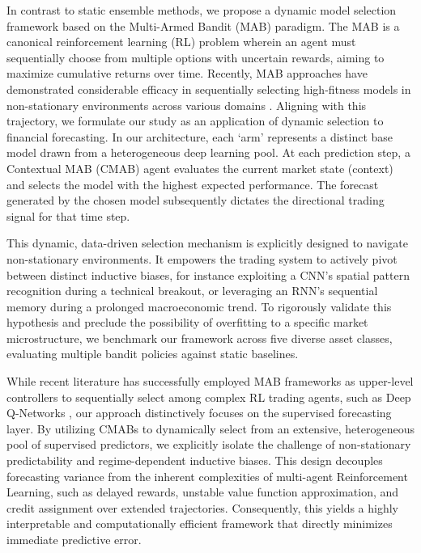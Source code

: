 \documentclass[pdflatex,sn-mathphys-num]{sn-jnl}
\theoremstyle{thmstyleone}%
\theoremstyle{thmstyletwo}%
\theoremstyle{thmstylethree}%
\begin{document}
In contrast to static ensemble methods, we propose a dynamic model selection framework based on the Multi-Armed Bandit (MAB) paradigm. The MAB is a canonical reinforcement learning (RL) problem wherein an agent must sequentially choose from multiple options with uncertain rewards, aiming to maximize cumulative returns over time. Recently, MAB approaches have demonstrated considerable efficacy in sequentially selecting high-fitness models in non-stationary environments across various domains \cite{pandian2025enhancing, wilson2024multi}. Aligning with this trajectory, we formulate our study as an application of dynamic selection to financial forecasting. In our architecture, each `arm' represents a distinct base model drawn from a heterogeneous deep learning pool. At each prediction step, a Contextual MAB (CMAB) agent evaluates the current market state (context) and selects the model with the highest expected performance. The forecast generated by the chosen model subsequently dictates the directional trading signal for that time step.

This dynamic, data-driven selection mechanism is explicitly designed to navigate non-stationary environments. It empowers the trading system to actively pivot between distinct inductive biases, for instance exploiting a CNN's spatial pattern recognition during a technical breakout, or leveraging an RNN's sequential memory during a prolonged macroeconomic trend. To rigorously validate this hypothesis and preclude the possibility of overfitting to a specific market microstructure, we benchmark our framework across five diverse asset classes, evaluating multiple bandit policies against static baselines. 

While recent literature has successfully employed MAB frameworks as upper-level controllers to sequentially select among complex RL trading agents, such as Deep Q-Networks \cite{zhu2019adaptive, zeng2023multi}, our approach distinctively focuses on the supervised forecasting layer. By utilizing CMABs to dynamically select from an extensive, heterogeneous pool of supervised predictors, we explicitly isolate the challenge of non-stationary predictability and regime-dependent inductive biases. This design decouples forecasting variance from the inherent complexities of multi-agent Reinforcement Learning, such as delayed rewards, unstable value function approximation, and credit assignment over extended trajectories. Consequently, this yields a highly interpretable and computationally efficient framework that directly minimizes immediate predictive error.
\end{document}

